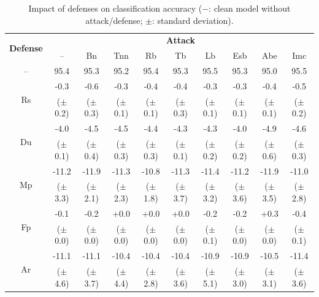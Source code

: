 \documentclass[compsoc,conference,a4paper,10pt,times]{IEEEtran}
\newcommand{\bn}{{\sc Bn}\xspace}
\newcommand{\tnn}{{\sc Tnn}\xspace}
\newcommand{\tb}{{\sc Tb}\xspace}
\newcommand{\lb}{{\sc Lb}\xspace}
\newcommand{\esb}{{\sc Esb}\xspace}
\newcommand{\rfb}{{\sc Rb}\xspace}
\newcommand{\abe}{{\sc Abe}\xspace}
\newcommand{\imc}{{\sc Imc}\xspace}
\newcommand{\du}{{\sc Du}\xspace}
\newcommand{\fp}{{\sc Fp}\xspace}
\newcommand{\at}{{\sc Ar}\xspace}
\newcommand{\rands}{{\sc Rs}\xspace}
\newcommand{\mmp}{{\sc Mp}\xspace}
\begin{document}
\begin{table}[!ht]{\footnotesize
\centering
\renewcommand{\arraystretch}{1.2}
\setlength{\tabcolsep}{0.3pt}
\begin{tabular}{c|c|c|c|c|c|c|c|c|c}
\multirow{2}{*}{\bf Defense} & \multicolumn{9}{c}{\bf Attack} \\
\cline{2-10}
& -- & \bn   & \tnn  & \rfb  & \tb   & \lb   & \esb  & \abe  & \imc \\
\hline
\hline
-- & 95.4 & 95.3 & 95.2 & 95.4 & 95.3 & 95.5 & 95.3 & 95.0 & 95.5 \\
\hline
\hline
\multirow{2}{*}{\rands}     & -0.3 & -0.6 & -0.3 & -0.4 & -0.4 & -0.3 & -0.3 & -0.4 & -0.5\\
           & ($\pm$0.2) & ($\pm$0.3) & ($\pm$0.1) & ($\pm$0.1) & ($\pm$0.3) & ($\pm$0.1) & ($\pm$0.1) & ($\pm$0.1) & ($\pm$0.2)\\
\hline
\multirow{2}{*}{\du}        & -4.0 & -4.5 & -4.5 & -4.4 & -4.3 & -4.3 & -4.0 & -4.9 & -4.6\\
           & ($\pm$0.1) & ($\pm$0.4) & ($\pm$0.3) & ($\pm$0.3) & ($\pm$0.1) & ($\pm$0.2) & ($\pm$0.2) & ($\pm$0.6) & ($\pm$0.3)\\
\hline
\multirow{2}{*}{\mmp}       & \cellcolor{Red}-11.2 & \cellcolor{Red}-11.9 &\cellcolor{Red}-11.3 & \cellcolor{Red}-10.8 & \cellcolor{Red}-11.3 & \cellcolor{Red}-11.4 & \cellcolor{Red}-11.2 & \cellcolor{Red}-11.9 & \cellcolor{Red}-11.0 \\
           & ($\pm$3.3) & ($\pm$2.1) & ($\pm$2.3) & ($\pm$1.8) & ($\pm$3.7) & ($\pm$3.2) & ($\pm$3.6) & ($\pm$3.5) & ($\pm$2.8)\\
\hline
\hline
\multirow{2}{*}{\fp}        & -0.1 & -0.2 & +0.0 & +0.0 & +0.0 &-0.2 & -0.2 & +0.3 & -0.4 \\
           & ($\pm$0.0) & ($\pm$0.0) & ($\pm$0.0) & ($\pm$0.0) & ($\pm$0.0) & ($\pm$0.1) & ($\pm$0.0) & ($\pm$0.0) & ($\pm$0.1)\\
\hline
\multirow{2}{*}{\at}        & \cellcolor{Red}-11.1 & \cellcolor{Red}-11.1 & \cellcolor{Red}-10.4 & \cellcolor{Red}-10.4 & \cellcolor{Red}-10.4 & \cellcolor{Red}-10.9 & \cellcolor{Red}-10.9 & \cellcolor{Red}-10.5 & \cellcolor{Red}-11.4 \\
           & ($\pm$4.6) & ($\pm$3.7) & ($\pm$4.4) & ($\pm$2.8) & ($\pm$3.6) & ($\pm$5.1) & ($\pm$3.0) & ($\pm$3.1) & ($\pm$3.6)\\
\end{tabular}
\caption{Impact of defenses on classification accuracy ($-$: clean model without attack/defense; $\pm$: standard deviation). \label{tab:clean-acc}}}
\end{table}
\end{document}
